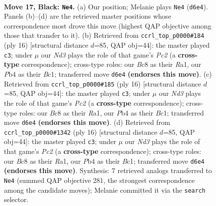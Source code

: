 \documentclass[11pt]{article}
\begin{document}
\clearpage

\begin{figure}[p]\centering
\begin{subfigure}{0.46\textwidth}\centering
\resizebox{\linewidth}{!}{%
\newchessgame
\chessboard[
  setfen={1rb2qk1/p1pp1ppp/3n4/6b1/1pNP4/1P6/P1P2P1P/1RBQ1BK1 b - - 1 17},
  showmover=false,
  pgfstyle=straightmove, color=movearrow, markmove={d6-e4}
]}
\caption{}
\end{subfigure}\hfill
\begin{subfigure}{0.46\textwidth}\centering
\resizebox{\linewidth}{!}{%
\newchessgame
\chessboard[
  setfen={r1bqkb1r/ppp2ppp/8/4P3/3n4/3P1N2/P1P3PP/R1BQKB1R w KQkq - 0 9},
  showmover=false,
  pgfstyle=straightmove, color=movearrow, markmove={c2-c3}
]}
\caption{}
\end{subfigure}
\\[4pt]
\begin{subfigure}{0.46\textwidth}\centering
\resizebox{\linewidth}{!}{%
\newchessgame
\chessboard[
  setfen={r1bqkb1r/ppp2ppp/8/4P3/3n4/3P1N2/P1P3PP/R1BQKB1R w KQkq - 0 9},
  showmover=false,
  pgfstyle=straightmove, color=movearrow, markmove={c2-c3}
]}
\caption{}
\end{subfigure}\hfill
\begin{subfigure}{0.46\textwidth}\centering
\resizebox{\linewidth}{!}{%
\newchessgame
\chessboard[
  setfen={r1bqkb1r/ppp2ppp/8/4P3/3n4/3P1N2/P1P3PP/R1BQKB1R w KQkq - 0 9},
  showmover=false,
  pgfstyle=straightmove, color=movearrow, markmove={c2-c3}
]}
\caption{}
\end{subfigure}
\caption{\textbf{Move 17, Black: \texttt{Ne4}.} (a) Our position; Melanie plays \texttt{Ne4} (\texttt{d6e4}). Panels (b)--(d) are the retrieved master positions whose correspondence most drove this move (highest QAP objective among those that transfer to it). (b) Retrieved from \texttt{ccrl\_top\_p0000\#184} (ply 16) [structural distance $d$=85, QAP obj=44]: the master played \texttt{c3}; under $\mu$ our \emph{Nd3} plays the role of that game's \emph{Pc2} (a \textbf{cross-type} correspondence); cross-type roles: our \emph{B}c8 as their \emph{R}a1, our \emph{P}b4 as their \emph{B}c1; transferred move \texttt{d6e4} \textbf{(endorses this move)}. (c) Retrieved from \texttt{ccrl\_top\_p0000\#185} (ply 16) [structural distance $d$=85, QAP obj=44]: the master played \texttt{c3}; under $\mu$ our \emph{Nd3} plays the role of that game's \emph{Pc2} (a \textbf{cross-type} correspondence); cross-type roles: our \emph{B}c8 as their \emph{R}a1, our \emph{P}b4 as their \emph{B}c1; transferred move \texttt{d6e4} \textbf{(endorses this move)}. (d) Retrieved from \texttt{ccrl\_top\_p0000\#1342} (ply 16) [structural distance $d$=85, QAP obj=44]: the master played \texttt{c3}; under $\mu$ our \emph{Nd3} plays the role of that game's \emph{Pc2} (a \textbf{cross-type} correspondence); cross-type roles: our \emph{B}c8 as their \emph{R}a1, our \emph{P}b4 as their \emph{B}c1; transferred move \texttt{d6e4} \textbf{(endorses this move)}. Synthesis: 7 retrieved analogs transferred to \texttt{Ne4} (summed QAP objective 281, the strongest correspondence among the candidate moves); Melanie committed it via the \texttt{search} selector.}
\label{fig:thought-m33}
\end{figure}
\end{document}

